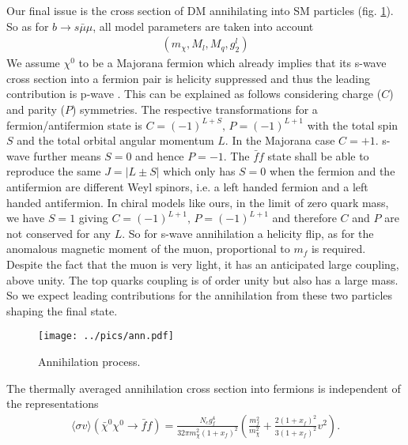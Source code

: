 Our final issue is the cross section of DM annihilating into SM particles (fig. \ref{pic_annihilation}). So as for $b\rightarrow s \bar\mu\mu$, all model parameters are taken into
account
\begin{align}
 \left(m_\chi, M_l, M_q, g^l_2\right)
\end{align}
We assume $\chi^0$ to be a Majorana fermion which already implies that its s-wave cross section into a fermion pair is helicity suppressed and 
thus the leading contribution is p-wave \cite{1307.8120}. This can be explained as follows considering charge ($C$) and parity ($P$) symmetries.
The respective transformations for a fermion/antifermion state is $C=(-1)^{L+S},\,P=(-1)^{L+1}$ with the total spin $S$ and the total orbital angular
momentum $L$. 
In the Majorana case $C=+1$. s-wave further means $S=0$ and hence $P=-1$. The $\bar f f$ state shall be able to reproduce the same $J=|L\pm S|$ 
which only has $S=0$ when the fermion and the antifermion are different Weyl spinors, i.e. a left handed fermion and a left handed antifermion.
In chiral models like ours, in the limit of zero quark mass, we have $S=1$ giving $C=(-1)^{L+1},\,P=(-1)^{L+1}$ and therefore $C$ and $P$ are not 
conserved for any $L$. So for s-wave annihilation a helicity flip, as for the anomalous magnetic moment of the muon, proportional to $m_f$ is 
required. Despite the fact that the muon is very light, it has an anticipated large coupling, above unity. The top quarks coupling is of order unity
but also has a large mass. So we expect leading contributions for the annihilation from these two particles shaping the final state.
\begin{figure}[t]
 \texttt{[image: ../pics/ann.pdf]}
 \caption{Annihilation process.}
 \label{pic_annihilation}
\end{figure}
The thermally averaged annihilation cross section into fermions is independent of the representations \cite{1503.01500}
\begin{align}
 \langle \sigma v \rangle \left(\bar \chi^0 \chi^0 \rightarrow \bar f f\right) = \frac{N_c g_f^4}{32\pi m_\chi^2\left(1+x_f\right)^2} \left(\frac{m_f^2}{m_\chi^2} + \frac{2\left(1+x_f\right)^2}{3\left(1+x_f\right)^2} v^2\right)  .
\end{align}

